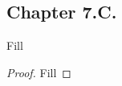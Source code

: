 \subsection*{Chapter 7.C. }


\begin{exercise}{1}
  Fill
\end{exercise}
\begin{proof}
 Fill
\end{proof}